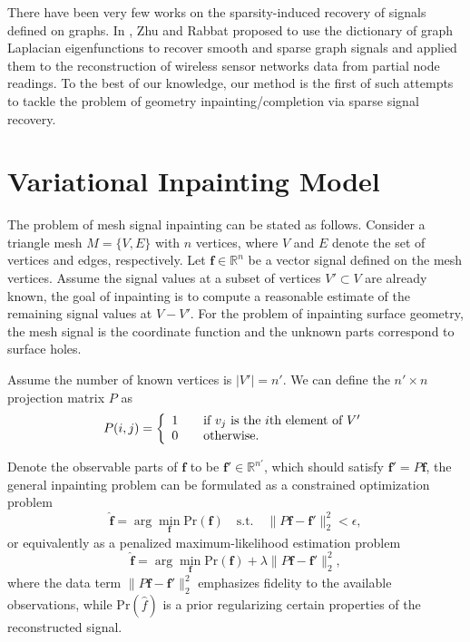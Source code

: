There have been very few works on the sparsity-induced recovery of
signals defined on graphs. In \cite{Zhu2012}, Zhu
and Rabbat proposed to use the dictionary of graph Laplacian
eigenfunctions to recover smooth and sparse graph signals and applied them
to the reconstruction of wireless sensor networks data from partial
node readings. To the best of our knowledge, our method is the first
of such attempts to tackle the problem of geometry
inpainting/completion via sparse signal recovery.

\section{Variational Inpainting Model}
\label{sec:model}

The problem of mesh signal inpainting can be stated as follows.
Consider a triangle mesh $M=\{V,E\}$ with $n$ vertices, where $V$ and
$E$ denote the set of vertices and edges, respectively. Let
$\mathbf{f}\in\mathbb{R}^n$ be a vector signal defined on the mesh
vertices. Assume the signal values at a subset of vertices $V'\subset
V$ are already known, the goal of inpainting is to compute a
reasonable estimate of the remaining signal values at $V - V'$. For
the problem of inpainting surface geometry, the mesh signal is the
coordinate function and the unknown parts correspond to surface holes.

Assume the number of known vertices is $|V'|=n'$. We can define the
$n' \times n$ projection matrix $P$ as
\begin{equation}
P(i,j) = \left\{
    \begin{array}{l l}
    1 & \quad \text{if $v_j$ is the $i$th element of $V'$}\\
    0 & \quad \text{otherwise.}
    \end{array}\right.
\end{equation}

Denote the observable parts of $\mathbf{f}$ to be $\mathbf{f'} \in
\mathbb{R}^{n'}$, which should satisfy $\mathbf{f}' = P\mathbf{f}$,
the general inpainting problem can be formulated as a constrained
optimization problem
\begin{equation}
\label{eq:inpainting}
\hat{\mathbf{f}} = \arg\min_{\mathbf{f}} \text{Pr}(\mathbf{f}) \quad \text{s.t.} \quad \|P\mathbf{f} - \mathbf{f'}\|_2^2 < \epsilon,
\end{equation}
or equivalently as a penalized maximum-likelihood estimation problem
\begin{equation}
\label{eq:inpainting2}
\hat{\mathbf{f}} = \arg\min_{\mathbf{f}} \text{Pr}(\mathbf{f}) + \lambda \|P\mathbf{f} - \mathbf{f}'\|_2^2,
\end{equation}
where the data term $\|P\mathbf{f} - \mathbf{f}'\|_2^2$ emphasizes
fidelity to the available observations, while $\text{Pr}(\hat{f})$ is
a prior regularizing certain properties of the reconstructed signal.

